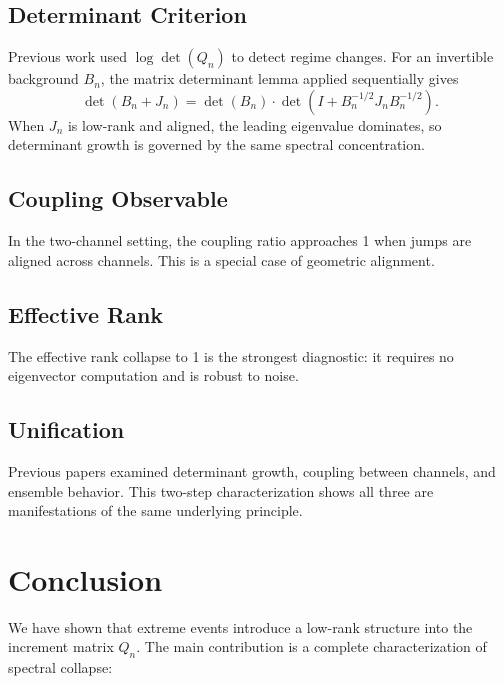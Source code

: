 \documentclass{article}
\begin{document}
\subsection{Determinant Criterion}

Previous work used \(\log \det(Q_n)\) to detect regime changes. For an invertible background \(B_n\), the matrix determinant lemma applied sequentially gives
\[
\det(B_n + J_n) = \det(B_n) \cdot \det(I + B_n^{-1/2} J_n B_n^{-1/2}).
\]
When \(J_n\) is low-rank and aligned, the leading eigenvalue dominates, so determinant growth is governed by the same spectral concentration.

\subsection{Coupling Observable}

In the two-channel setting, the coupling ratio approaches 1 when jumps are aligned across channels. This is a special case of geometric alignment.

\subsection{Effective Rank}

The effective rank collapse to 1 is the strongest diagnostic: it requires no eigenvector computation and is robust to noise.

\subsection{Unification}

Previous papers examined determinant growth, coupling between channels, and ensemble behavior. This two-step characterization shows all three are manifestations of the same underlying principle.

\section{Conclusion}

We have shown that extreme events introduce a low-rank structure into the increment matrix \(Q_n\). The main contribution is a complete characterization of spectral collapse:
\end{document}
